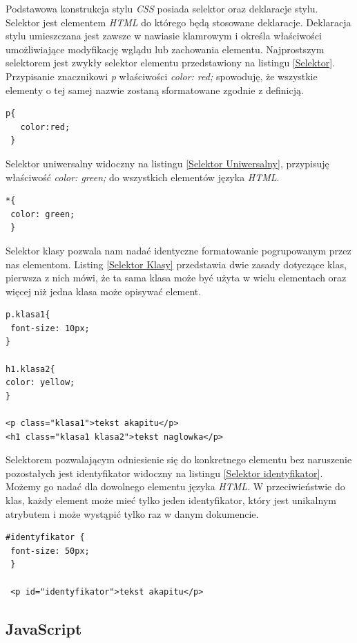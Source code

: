 \documentclass{iiuwb}
\begin{document}
Podstawowa konstrukcja stylu \textit{CSS} posiada selektor oraz deklaracje stylu. Selektor jest elementem \textit{HTML} do którego będą stosowane deklaracje. Deklaracja stylu umieszczana jest zawsze w nawiasie klamrowym i określa właściwości umożliwiające modyfikację wglądu lub zachowania elementu. Najprostszym selektorem jest zwykły selektor elementu przedstawiony na listingu \ref{Selektor}. Przypisanie znacznikowi \textit{p} właściwości \textit{color: red;} spowoduję, że wszystkie elementy o tej samej nazwie zostaną sformatowane zgodnie z definicją.
\begin{lstlisting}[label=Selektor, caption=Selektor elementu,float=ht]
 p{ 
   color:red;
 }
\end{lstlisting}
Selektor uniwersalny widoczny na listingu \ref{Selektor Uniwersalny}, przypisuję właściwość \textit{color: green;} do wszystkich elementów języka \textit{HTML}. 
\begin{lstlisting}[label=Selektor Uniwersalny, caption=Selektor uniwersalny]
*{
 color: green;
 }
\end{lstlisting}
Selektor klasy pozwala nam nadać identyczne formatowanie pogrupowanym przez nas elementom. Listing  \ref{Selektor Klasy} przedstawia dwie zasady dotyczące klas, pierwsza z nich mówi, że ta sama klasa może być użyta w wielu elementach oraz więcej niż jedna klasa może opisywać element.
\begin{lstlisting}[label=Selektor Klasy, caption=Selektor klasy]
p.klasa1{
 font-size: 10px;
}

h1.klasa2{
color: yellow;
}

<p class="klasa1">tekst akapitu</p>
<h1 class="klasa1 klasa2">tekst naglowka</p>
\end{lstlisting}
 Selektorem pozwalającym odniesienie się do konkretnego elementu bez naruszenie pozostałych jest identyfikator widoczny na listingu \ref{Selektor identyfikator}. Możemy go nadać dla dowolnego elementu języka \textit{HTML}. W przeciwieństwie do klas, każdy element może mieć tylko jeden identyfikator, który jest unikalnym atrybutem i może wystąpić tylko raz w danym dokumencie. 
 \begin{lstlisting}[label=Selektor identyfikator, caption=Selektor identyfikatora]
#identyfikator {
 font-size: 50px;
 }
 
 <p id="identyfikator">tekst akapitu</p>
 \end{lstlisting}
\subsection{JavaScript}
\end{document}
